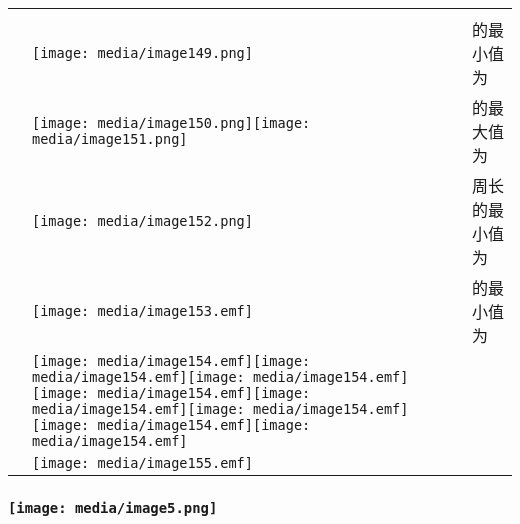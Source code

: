 \documentclass[a4paper,11pt,UTF8]{ctexart}
\begin{document}
\begin{longtable}[]{@{}lll@{}}
\toprule
\endhead
& &\tabularnewline
& \texttt{[image: media/image149.png]}
& 的最小值为\tabularnewline
&
\texttt{[image: media/image150.png]}\texttt{[image: media/image151.png]}
& 的最大值为\tabularnewline
& \texttt{[image: media/image152.png]}
& 周长的最小值为\tabularnewline
& \texttt{[image: media/image153.emf]}
& 的最小值为\tabularnewline
&
\texttt{[image: media/image154.emf]}\texttt{[image: media/image154.emf]}\texttt{[image: media/image154.emf]}\texttt{[image: media/image154.emf]}\texttt{[image: media/image154.emf]}\texttt{[image: media/image154.emf]}\texttt{[image: media/image154.emf]}\texttt{[image: media/image154.emf]}
&\tabularnewline
& \texttt{[image: media/image155.emf]}
&\tabularnewline
\bottomrule
\end{longtable}

\hypertarget{ux5b66ux79d1ux7f51www.zxxk.com--ux6559ux80b2ux8d44ux6e90ux95e8ux6237ux63d0ux4f9bux8bd5ux9898ux8bd5ux5377ux6559ux6848ux8bfeux4ef6ux6559ux5b66ux8bbaux6587ux7d20ux6750ux7b49ux5404ux7c7bux6559ux5b66ux8d44ux6e90ux5e93ux4e0bux8f7dux8fd8ux6709ux5927ux91cfux4e30ux5bccux7684ux6559ux5b66ux8d44ux8baf-28}{%
\subsubsection{\texorpdfstring{\protect\texttt{[image: media/image5.png]}}{学科网(www.zxxk.com)-\/-教育资源门户，提供试题试卷、教案、课件、教学论文、素材等各类教学资源库下载，还有大量丰富的教学资讯！}}\label{ux5b66ux79d1ux7f51www.zxxk.com--ux6559ux80b2ux8d44ux6e90ux95e8ux6237ux63d0ux4f9bux8bd5ux9898ux8bd5ux5377ux6559ux6848ux8bfeux4ef6ux6559ux5b66ux8bbaux6587ux7d20ux6750ux7b49ux5404ux7c7bux6559ux5b66ux8d44ux6e90ux5e93ux4e0bux8f7dux8fd8ux6709ux5927ux91cfux4e30ux5bccux7684ux6559ux5b66ux8d44ux8baf-28}}
\end{document}
